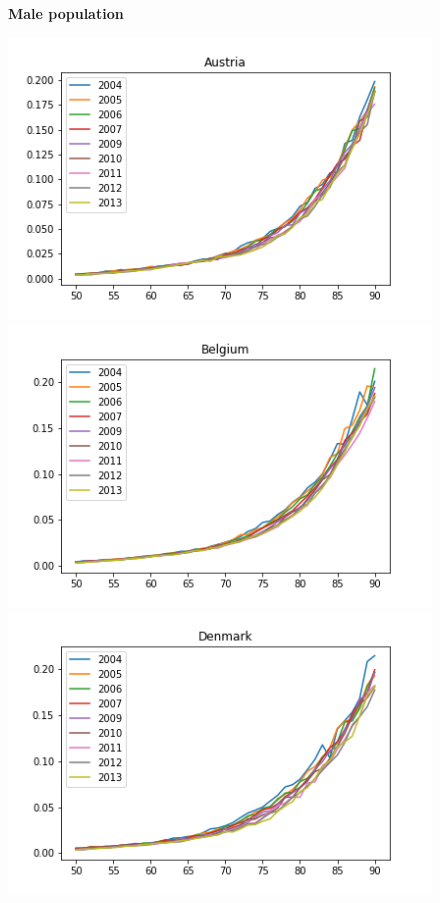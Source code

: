 \begin{figure}[H]
\centering \textbf{Male population}\par\medskip
{}
  \includegraphics[width=\linewidth]{images/mortality_male_1.png}
\endminipage\hfill
{}
  \includegraphics[width=\linewidth]{images/mortality_male_2.png}
\endminipage\hfill
{}%
  \includegraphics[width=\linewidth]{images/mortality_male_3.png}

\end{figure}
